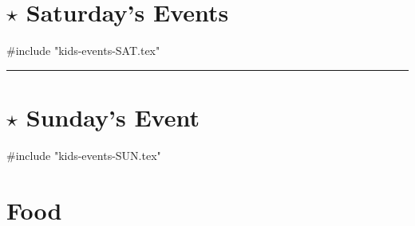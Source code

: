 \documentclass[9pt,twoside,openright,final,article,letterpaper]{memoir}
\renewcommand{\pfbreakdisplay}{%
  \needspace{24pt}%
  \vspace{8pt}\\\ding{76}\quad\ding{77}\quad\ding{78}\\%
  \vspace{11pt}}
\let\oldsection=\section
\renewcommand{\section}[1]{%
  \nopagebreak
  \vspace{6pt} %
  \needspace{1.5in}
  \oldsection{#1}
  \nopagebreak}
\begin{document}

\vfill

\begin{multicols}{3}
  \section{{\Large $\star$} Saturday's Events}
  #include "kids-events-SAT.tex"

  \fancybreak{\pfbreakdisplay}

  \section{{\Large $\star$} Sunday's Event}
  #include "kids-events-SUN.tex"
\end{multicols}

\section{Food}
\end{document}

